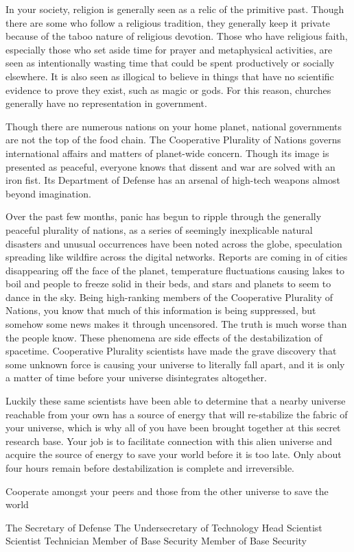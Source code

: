 \documentclass[blue]{guildcamp3}
\begin{document}
In your society, religion is generally seen as a relic of the primitive past. Though there are some who follow a religious tradition, they generally keep it private because of the taboo nature of religious devotion. Those who have religious faith, especially those who set aside time for prayer and metaphysical activities, are seen as intentionally wasting time that could be spent productively or socially elsewhere. It is also seen as illogical to believe in things that have no scientific evidence to prove they exist, such as magic or gods. For this reason, churches generally have no representation in government.

Though there are numerous nations on your home planet, national governments are not the top of the food chain. The Cooperative Plurality of Nations governs international affairs and matters of planet-wide concern. Though its image is presented as peaceful, everyone knows that dissent and war are solved with an iron fist. Its Department of Defense has an arsenal of high-tech weapons almost beyond imagination.

Over the past few months, panic has begun to ripple through the generally peaceful plurality of nations, as a series of seemingly inexplicable natural disasters and unusual occurrences have been noted across the globe, speculation spreading like wildfire across the digital networks. Reports are coming in of cities disappearing off the face of the planet, temperature fluctuations causing lakes to boil and people to freeze solid in their beds, and stars and planets to seem to dance in the sky. Being high-ranking members of the Cooperative Plurality of Nations, you know that much of this information is being suppressed, but somehow some news makes it through uncensored. The truth is much worse than the people know. These phenomena are side effects of the destabilization of spacetime. Cooperative Plurality scientists have made the grave discovery that some unknown force is causing your universe to literally fall apart, and it is only a matter of time before your universe disintegrates altogether.

Luckily these same scientists have been able to determine that a nearby universe reachable from your own has a source of energy that will re-stabilize the fabric of your universe, which is why all of you have been brought together at this secret research base. Your job is to facilitate connection with this alien universe and acquire the source of energy to save your world before it is too late. Only about four hours remain before destabilization is complete and irreversible.

\begin{itemz}[Goals]
	\item Cooperate amongst your peers and those from the other universe to save the world
\end{itemz}


\begin{members}
	\member{\cPolOne{}} The Secretary of Defense
	\member{\cPolTwo{}} The Undersecretary of Technology
	\member{\cSciOne{}} Head Scientist
	\member{\cSciTwo{}} Scientist
	\member{\cTech{}} Technician
	\member{\cSpecOpOne{}} Member of Base Security
	\member{\cSpecOpTwo{}} Member of Base Security
\end{members}
\end{document}
